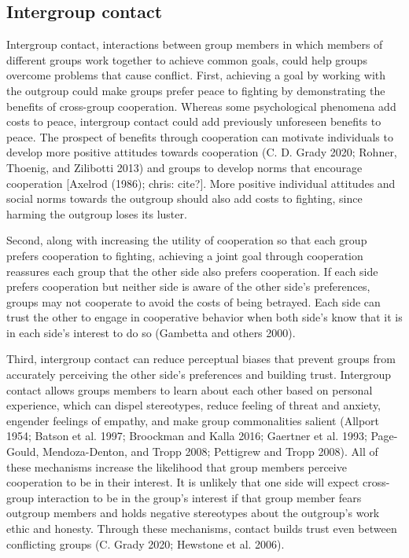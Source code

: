\documentclass[11pt]{article}
\begin{document}
\hypertarget{intergroup-contact}{%
\subsection{Intergroup contact}\label{intergroup-contact}}

Intergroup contact, interactions between group members in which members
of different groups work together to achieve common goals, could help
groups overcome problems that cause conflict. First, achieving a goal by
working with the outgroup could make groups prefer peace to fighting by
demonstrating the benefits of cross-group cooperation. Whereas some
psychological phenomena add costs to peace, intergroup contact could add
previously unforeseen benefits to peace. The prospect of benefits
through cooperation can motivate individuals to develop more positive
attitudes towards cooperation (C. D. Grady 2020; Rohner, Thoenig, and
Zilibotti 2013) and groups to develop norms that encourage cooperation
{[}Axelrod (1986); chris: cite?{]}. More positive individual attitudes
and social norms towards the outgroup should also add costs to fighting,
since harming the outgroup loses its luster.

Second, along with increasing the utility of cooperation so that each
group prefers cooperation to fighting, achieving a joint goal through
cooperation reassures each group that the other side also prefers
cooperation. If each side prefers cooperation but neither side is aware
of the other side's preferences, groups may not cooperate to avoid the
costs of being betrayed. Each side can trust the other to engage in
cooperative behavior when both side's know that it is in each side's
interest to do so (Gambetta and others 2000).

Third, intergroup contact can reduce perceptual biases that prevent
groups from accurately perceiving the other side's preferences and
building trust. Intergroup contact allows groups members to learn about
each other based on personal experience, which can dispel stereotypes,
reduce feeling of threat and anxiety, engender feelings of empathy, and
make group commonalities salient (Allport 1954; Batson et al. 1997;
Broockman and Kalla 2016; Gaertner et al. 1993; Page-Gould,
Mendoza-Denton, and Tropp 2008; Pettigrew and Tropp 2008). All of these
mechanisms increase the likelihood that group members perceive
cooperation to be in their interest. It is unlikely that one side will
expect cross-group interaction to be in the group's interest if that
group member fears outgroup members and holds negative stereotypes about
the outgroup's work ethic and honesty. Through these mechanisms, contact
builds trust even between conflicting groups (C. Grady 2020; Hewstone et
al. 2006).
\end{document}
